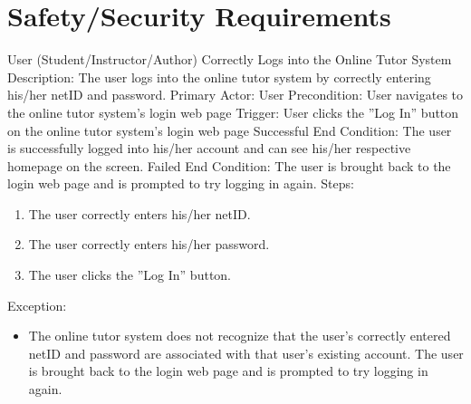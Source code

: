 
\chapter{Safety/Security Requirements}
    
    \begin{section}{User (Student/Instructor/Author) Correctly Logs into the Online Tutor System}
        Description: The user logs into the online tutor system by correctly entering his/her netID and password. \newline
        Primary Actor: User \newline
        Precondition: User navigates to the online tutor system's login web page \newline
        Trigger: User clicks the ''Log In'' button on the online tutor system's login web page \newline
        Successful End Condition: The user is successfully logged into his/her account and can see his/her respective homepage on the screen. \newline
        Failed End Condition: The user is brought back to the login web page and is prompted to try logging in again. \newline
        \newline
        Steps:
        \begin{enumerate}
            \item{The user correctly enters his/her netID.}
            \item{The user correctly enters his/her password.}
            \item{The user clicks the ''Log In'' button.}
        \end{enumerate}
        Exception:
        \begin{itemize}
            \item{The online tutor system does not recognize that the user's correctly entered netID and password are associated with that user's existing account.
            The user is brought back to the login web page and is prompted to try logging in again.}
        \end{itemize}
    \end{section}
    
